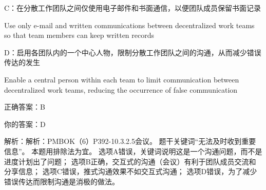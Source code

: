 C：在分散工作团队之间仅使用电子邮件和书面通信，以便团队成员保留书面记录

Use only e-mail and written communications between decentralized work teams so that team members can keep written records

D：启用各团队内的一个中心人物，限制分散工作团队之间的沟通，从而减少错误传达的发生

Enable a central person within each team to limit communication between decentralized work teams, reducing the occurrence of false communication

正确答案：B

你的答案：D

解析：解析：PMBOK（6）P392-10.3.2.5会议。 题干关键词“无法及时收到重要信息”。 本题用排除法为宜。 选项A错误，关键词说明这是一个沟通问题，而不是进度计划出了问题； 选项B正确，交互式的沟通（会议）有利于团队成员交流和分享信息； 选项C错误，推式沟通效果不如交互式沟通； 选项D错误，为了减少错误传达而限制沟通是消极的做法。



